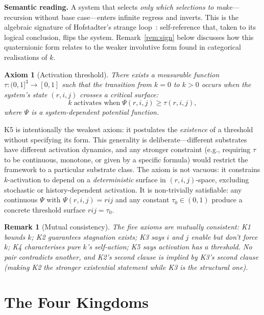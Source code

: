 \documentclass[11pt,a4paper]{article}
\newtheorem{remark}[theorem]{Remark}
\newtheorem{axiom}{Axiom}
\newcommand{\rey}[1]{{\color{rcolor}#1}}
\newcommand{\imag}[1]{{\color{icolor}#1}}
\newcommand{\exac}[1]{{\color{jcolor}#1}}
\newcommand{\recu}[1]{{\color{kcolor}#1}}
\def\rey#1{#1}%
\def\imag#1{#1}%
\def\exac#1{#1}%
\def\recu#1{#1}%
\begin{document}
\smallskip
\noindent\textbf{Semantic reading.} A system that selects
\emph{only which selections to make}---recursion without base
case---enters infinite regress and inverts. This is the algebraic
signature of Hofstadter's strange
loop~\citep{hofstadter1979}: self-reference that, taken to its
logical conclusion, flips the system.
Remark~\ref{rem:sign} below discusses how this quaternionic form
relates to the weaker involutive form found in categorical
realisations of $\recu{k}$.

\begin{axiombox}
\begin{axiom}[Activation threshold]\label{ax:thresh}
There exists a measurable function $\tau: (0,1]^3 \to [0,1]$ such
that the transition from $\recu{k} = 0$ to $\recu{k} > 0$ occurs when
the system's state $(\rey{r}, \imag{i}, \exac{j})$ crosses a critical
surface:
\[
  \recu{k} \;\text{activates when}\; \Psi(r, i, j) \geq \tau(r, i, j),
\]
where $\Psi$ is a system-dependent potential function.
\end{axiom}
\end{axiombox}

K5 is intentionally the weakest axiom: it postulates the
\emph{existence} of a threshold without specifying its form.
This generality is deliberate---different substrates have different
activation dynamics, and any stronger constraint (e.g., requiring
$\tau$ to be continuous, monotone, or given by a specific formula)
would restrict the framework to a particular substrate class.
The axiom is not vacuous: it constrains $\recu{k}$-activation to
depend on a \emph{deterministic} surface in $(r,i,j)$-space,
excluding stochastic or history-dependent activation. It is
non-trivially satisfiable: any continuous $\Psi$ with
$\Psi(r,i,j)=rij$ and any constant $\tau_0\in(0,1)$ produce a
concrete threshold surface $rij=\tau_0$.

\begin{remark}[Mutual consistency]
The five axioms are mutually consistent: K1 bounds $k$; K2 guarantees
stagnation exists; K3 says $i$ and $j$ enable but don't force $k$; K4
characterises pure $k$'s self-action; K5 says activation has a
threshold. No pair contradicts another, and K2's second clause is
implied by K3's second clause (making K2 the stronger existential
statement while K3 is the structural one).
\end{remark}

\section{The Four Kingdoms}
\label{sec:kingdoms}
\end{document}
